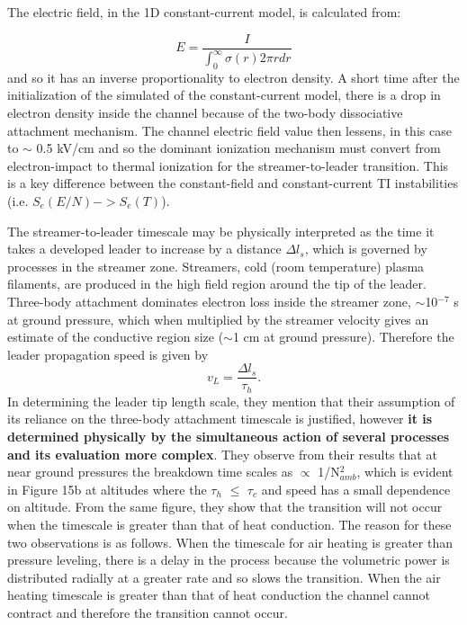 \documentclass[]{article}
\begin{document}
	The electric field, in the 1D constant-current model, is calculated from:
	
	\[ E = \frac{I}{\int_{0}^{\infty} \sigma(r)2\pi r dr}\]
	and so it has an inverse proportionality to electron density. A short time after the initialization of the simulated of the constant-current model, there is a drop in electron density inside the channel because of the two-body dissociative attachment mechanism. The channel electric field value then lessens, in this case to $\sim$ 0.5 kV/cm and so the dominant ionization mechanism must convert from electron-impact to thermal ionization for the streamer-to-leader transition. This is a key difference between the constant-field and constant-current TI instabilities (i.e. $S_e(E/N) -> S_e(T)$).
	
	The streamer-to-leader timescale may be physically interpreted as the time it takes a developed leader to increase by a distance $\Delta l_s$, which is governed by processes in the streamer zone. Streamers, cold (room temperature) plasma filaments, are produced in the high field region around the tip of the leader. Three-body attachment dominates electron loss inside the streamer zone, $\sim$10$^{-7}$ s at ground pressure, which when multiplied by the streamer velocity gives an estimate of the conductive region size ($\sim$1 cm at ground pressure). Therefore the leader propagation speed is given by
	\[ v_L = \frac{\Delta l_s}{\tau_h}.\]
	In determining the leader tip length scale, they mention that their assumption of its reliance on the three-body attachment timescale is justified, however \textbf{it is determined physically by the simultaneous action of several processes and its evaluation more complex}. They observe from their results that at near ground pressures the breakdown time scales as $\propto$ 1/N$^2_{amb}$, which is evident in Figure 15b at altitudes where the $\tau_h$ $\le$ $\tau_c$ and speed has a small dependence on altitude. From the same figure, they show that the transition will not occur when the timescale is greater than that of heat conduction. The reason for these two observations is as follows. When the timescale for air heating is greater than pressure leveling, there is a delay in the process because the volumetric power is distributed radially at a greater rate and so slows the transition. When the air heating timescale is greater than that of heat conduction the channel cannot contract and therefore the transition cannot occur.
	
\end{document}
